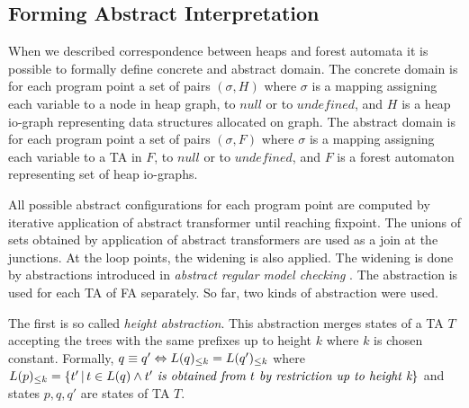 \documentclass[a4paper, 12pt]{article}
\begin{document}
\subsection{Forming Abstract Interpretation}
When we described correspondence between heaps and forest automata
it is possible to formally define concrete and abstract domain.
The concrete domain is for each program point a set of pairs $(\sigma, H)$
where $\sigma$ is a mapping assigning each variable to a node in heap graph,
to $null$ or to $undefined$, and $H$ is a heap io-graph representing data
structures allocated on graph.
The abstract domain is for each program point a set of pairs $(\sigma, F)$
where $\sigma$ is a mapping assigning each variable to a TA in $F$,
to $null$ or to $undefined$, and $F$ is a forest automaton representing
set of heap io-graphs.

All possible abstract configurations for each program point are computed by
iterative application of abstract transformer until reaching fixpoint.
The unions of sets obtained by application of abstract transformers are used
as a join at the junctions.
At the loop points, the widening is also applied.
The widening is done by abstractions introduced in \emph{abstract regular model checking} \cite{artmc}.
The abstraction is used for each TA of FA separately.
So far, two kinds of abstraction were used.

The first is so called \emph{height abstraction}.
This abstraction merges states of a TA $T$ accepting the trees
with the same prefixes up to height $k$ where $k$ is chosen constant.
Formally, $q \equiv q' \Leftrightarrow L(q)_{\leq k} = L(q')_{\leq k}$
where $L(p)_{\leq k} = \{t'\,|\, t \in L(q) \wedge t' \emph{ is obtained from } t \emph{ by restriction up to height k}\}$
and states $p,q,q'$ are states of TA $T$.
\end{document}
